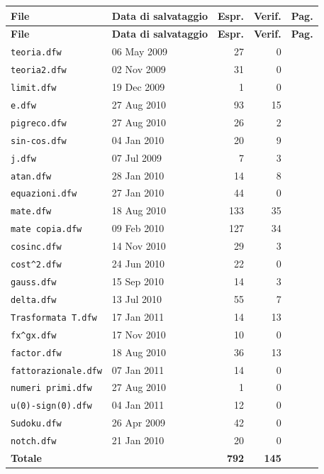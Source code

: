 \begin{longtable}{@{}l l r r r@{}}
\toprule
\textbf{File} & \textbf{Data di salvataggio} & \textbf{Espr.} & \textbf{Verif.} & \textbf{Pag.} \\
\midrule
\endfirsthead
\toprule
\textbf{File} & \textbf{Data di salvataggio} & \textbf{Espr.} & \textbf{Verif.} & \textbf{Pag.} \\
\midrule
\endhead
\texttt{teoria.dfw} & 06 May 2009 & 27 & 0 & \pageref{cap:teoria} \\
\texttt{teoria2.dfw} & 02 Nov 2009 & 31 & 0 & \pageref{cap:teoria2} \\
\texttt{limit.dfw} & 19 Dec 2009 & 1 & 0 & \pageref{cap:limit} \\
\texttt{e.dfw} & 27 Aug 2010 & 93 & 15 & \pageref{cap:e} \\
\texttt{pigreco.dfw} & 27 Aug 2010 & 26 & 2 & \pageref{cap:pigreco} \\
\texttt{sin-cos.dfw} & 04 Jan 2010 & 20 & 9 & \pageref{cap:sin-cos} \\
\texttt{j.dfw} & 07 Jul 2009 & 7 & 3 & \pageref{cap:j} \\
\texttt{atan.dfw} & 28 Jan 2010 & 14 & 8 & \pageref{cap:atan} \\
\texttt{equazioni.dfw} & 27 Jan 2010 & 44 & 0 & \pageref{cap:equazioni} \\
\texttt{mate.dfw} & 18 Aug 2010 & 133 & 35 & \pageref{cap:mate} \\
\texttt{mate copia.dfw} & 09 Feb 2010 & 127 & 34 & \pageref{cap:mate-copia} \\
\texttt{cosinc.dfw} & 14 Nov 2010 & 29 & 3 & \pageref{cap:cosinc} \\
\texttt{cost\textasciicircum{}2.dfw} & 24 Jun 2010 & 22 & 0 & \pageref{cap:cost2} \\
\texttt{gauss.dfw} & 15 Sep 2010 & 14 & 3 & \pageref{cap:gauss} \\
\texttt{delta.dfw} & 13 Jul 2010 & 55 & 7 & \pageref{cap:delta} \\
\texttt{Trasformata T.dfw} & 17 Jan 2011 & 14 & 13 & \pageref{cap:trasformata-t} \\
\texttt{fx\textasciicircum{}gx.dfw} & 17 Nov 2010 & 10 & 0 & \pageref{cap:fxgx} \\
\texttt{factor.dfw} & 18 Aug 2010 & 36 & 13 & \pageref{cap:factor} \\
\texttt{fattorazionale.dfw} & 07 Jan 2011 & 14 & 0 & \pageref{cap:fattorazionale} \\
\texttt{numeri primi.dfw} & 27 Aug 2010 & 1 & 0 & \pageref{cap:numeri-primi} \\
\texttt{u(0)-sign(0).dfw} & 04 Jan 2011 & 12 & 0 & \pageref{cap:u0-sign0} \\
\texttt{Sudoku.dfw} & 26 Apr 2009 & 42 & 0 & \pageref{cap:sudoku} \\
\texttt{notch.dfw} & 21 Jan 2010 & 20 & 0 & \pageref{cap:notch} \\
\midrule
\textbf{Totale} & & \textbf{792} & \textbf{145} & \\
\bottomrule
\end{longtable}
